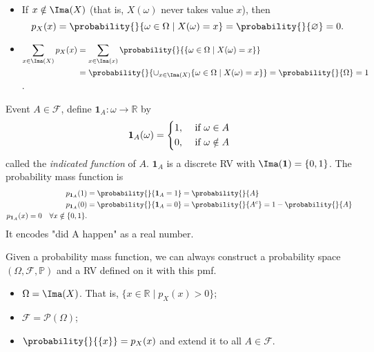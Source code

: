 \begin{note}
    \leavevmode
    \begin{itemize}
    \item If \(x \notin \Ima(X)\) (that is, \(X(\omega)\) never takes value \(x\)), then
    \[p_X(x) = \probability{}{\omega \in \Omega\mid X(\omega) = x}=\probability{}{\varnothing} = 0.\]
    \item \(\begin{aligned}[t]\sum\limits_{x\in \Ima(X)}p_X(x) &= \sum\limits_{x\in \Ima(x)}\probability{}{\{\omega \in \Omega\mid X(\omega) = x\}}\\
    &=\probability{}{\cup_{x\in \Ima(X)}\{\omega\in \Omega\mid X(\omega)=x\}}=\probability{}{\Omega} = 1 \end{aligned}\).
    \end{itemize}
\end{note}
\begin{example}
    Event \(A\in \mathcal{F} \), define \(\mathbf{1}_A:\omega \to \mathbb{R}\) by
    \[
    \textbf{1}_A(\omega) = \begin{dcases}
        1, &\text{ if } \omega \in A\\
        0, &\text{ if }\omega \notin A \\
    \end{dcases}
    \]
    called the \textit{indicated function} of \(A\). \(\textbf{1}_{A}\) is a discrete RV with \(\Ima(\textbf{1}) = \{0,1\}\). The probability mass function is
    \begin{align*}
        p_{\textbf{1}_A}(1) &= \probability{}{\textbf{1}_A = 1} = \probability{}{A}\\
        p_{\textbf{1}_A}(0) &= \probability{}{\textbf{1}_A = 0} = \probability{}{A^c} = 1 - \probability{}{A} \\
        p_{\textbf{1}_A}(x) = 0 \quad \forall x \notin \{0,1\}.
    \end{align*}
    It encodes "did A happen" as a real number.
\end{example}
\begin{remark}
    Given a probability mass function, we can always construct a probability space \((\Omega, \mathcal{F}, \mathbb{P})\) and a RV defined on it with this pmf.
    \begin{itemize}
    \item \(\Omega = \Ima(X)\). That is, \(\{x \in \mathbb{R}\mid p_X(x) > 0\}\);
    \item \(\mathcal{F} = \mathcal{P}(\Omega)\);
    \item \(\probability{}{\{x\}} = p_X(x)\) and extend it to all \(A \in \mathcal{F}\).
    \end{itemize}
\end{remark}